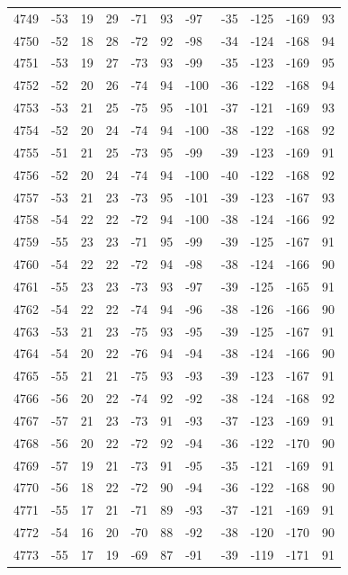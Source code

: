 \begin{table}[H]
\begin{tabular}{lllllllllll}
4749 & -53 & 19 & 29 & -71 & 93 & -97 & -35 & -125 & -169 & 93 \\
4750 & -52 & 18 & 28 & -72 & 92 & -98 & -34 & -124 & -168 & 94 \\
4751 & -53 & 19 & 27 & -73 & 93 & -99 & -35 & -123 & -169 & 95 \\
4752 & -52 & 20 & 26 & -74 & 94 & -100 & -36 & -122 & -168 & 94 \\
4753 & -53 & 21 & 25 & -75 & 95 & -101 & -37 & -121 & -169 & 93 \\
4754 & -52 & 20 & 24 & -74 & 94 & -100 & -38 & -122 & -168 & 92 \\
4755 & -51 & 21 & 25 & -73 & 95 & -99 & -39 & -123 & -169 & 91 \\
4756 & -52 & 20 & 24 & -74 & 94 & -100 & -40 & -122 & -168 & 92 \\
4757 & -53 & 21 & 23 & -73 & 95 & -101 & -39 & -123 & -167 & 93 \\
4758 & -54 & 22 & 22 & -72 & 94 & -100 & -38 & -124 & -166 & 92 \\
4759 & -55 & 23 & 23 & -71 & 95 & -99 & -39 & -125 & -167 & 91 \\
4760 & -54 & 22 & 22 & -72 & 94 & -98 & -38 & -124 & -166 & 90 \\
4761 & -55 & 23 & 23 & -73 & 93 & -97 & -39 & -125 & -165 & 91 \\
4762 & -54 & 22 & 22 & -74 & 94 & -96 & -38 & -126 & -166 & 90 \\
4763 & -53 & 21 & 23 & -75 & 93 & -95 & -39 & -125 & -167 & 91 \\
4764 & -54 & 20 & 22 & -76 & 94 & -94 & -38 & -124 & -166 & 90 \\
4765 & -55 & 21 & 21 & -75 & 93 & -93 & -39 & -123 & -167 & 91 \\
4766 & -56 & 20 & 22 & -74 & 92 & -92 & -38 & -124 & -168 & 92 \\
4767 & -57 & 21 & 23 & -73 & 91 & -93 & -37 & -123 & -169 & 91 \\
4768 & -56 & 20 & 22 & -72 & 92 & -94 & -36 & -122 & -170 & 90 \\
4769 & -57 & 19 & 21 & -73 & 91 & -95 & -35 & -121 & -169 & 91 \\
4770 & -56 & 18 & 22 & -72 & 90 & -94 & -36 & -122 & -168 & 90 \\
4771 & -55 & 17 & 21 & -71 & 89 & -93 & -37 & -121 & -169 & 91 \\
4772 & -54 & 16 & 20 & -70 & 88 & -92 & -38 & -120 & -170 & 90 \\
4773 & -55 & 17 & 19 & -69 & 87 & -91 & -39 & -119 & -171 & 91 \\

\end{tabular}
\end{table}
